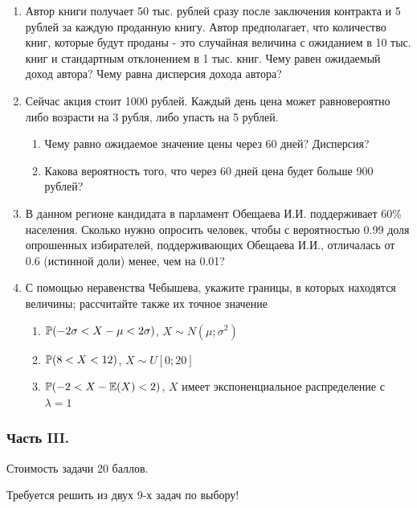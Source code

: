 \documentclass[12pt, a4paper]{article}\usepackage[]{graphicx}\usepackage[]{color}
\begin{document}
\begin{enumerate}
\item Автор книги получает 50 тыс. рублей сразу после заключения
контракта и 5 рублей за каждую проданную книгу. Автор
предполагает, что количество книг, которые будут проданы - это
случайная величина с ожиданием в 10 тыс. книг и стандартным
отклонением в 1 тыс. книг. Чему равен ожидаемый доход автора? Чему
равна дисперсия дохода автора?

\item Сейчас акция стоит 1000 рублей. Каждый день цена может равновероятно либо возрасти на 3 рубля, либо упасть на 5 рублей.
\begin{enumerate}
\item Чему равно ожидаемое значение цены через 60 дней? Дисперсия?
\item Какова вероятность того, что через 60 дней цена будет больше 900 рублей?
\end{enumerate}


\item В данном регионе кандидата в парламент Обещаева И.И.
поддерживает 60\% населения. Сколько нужно опросить человек, чтобы
с вероятностью 0.99 доля  опрошенных избирателей, поддерживающих
Обещаева И.И.,  отличалась от 0.6 (истинной доли) менее, чем на
0.01?

\item С помощью неравенства Чебышева, укажите границы, в которых
находятся величины; рассчитайте также их точное значение
\begin{enumerate}
\item  $\P(-2\sigma<X-\mu<2\sigma)$, $X\sim N(\mu;\sigma^{2})$
\item  $\P(8<X<12)$, $X\sim U[0;20]$
\item $\P(-2<X-\E(X)<2)$, $X$ имеет экспоненциальное распределение с
$\lambda=1$
\end{enumerate}
\end{enumerate}

\subsubsection*{Часть III.}

Стоимость задачи 20 баллов.

Требуется решить \textbf{} из двух 9-х задач по
выбору!
\end{document}
